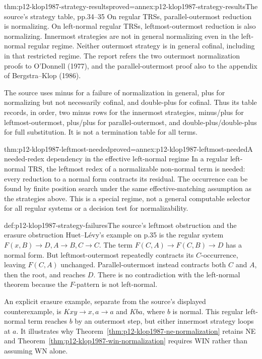 \begin{hbtheorem}{thm:p12-klop1987-strategy-results}{proved=annex:p12-klop1987-strategy-results}{The source's strategy table, pp.34--35}
On regular TRSs, parallel-outermost reduction is normalizing. On left-normal regular TRSs,
leftmost-outermost reduction is also normalizing. Innermost strategies
are not in general normalizing even in the left-normal regular regime.
Neither outermost strategy is in general cofinal, including in that
restricted regime. The report refers the two outermost normalization
proofs to O'Donnell (1977), and the parallel-outermost proof also to the
appendix of Bergstra--Klop (1986).
\end{hbtheorem}

The source uses minus for a failure of normalization in general, plus
for normalizing but not necessarily cofinal, and double-plus for cofinal.
Thus its table records, in order, two minus rows for the innermost
strategies, minus/plus for leftmost-outermost, plus/plus for
parallel-outermost, and double-plus/double-plus for full substitution.
It is not a termination table for all terms.

\begin{hblemma}{thm:p12-klop1987-leftmost-needed}{proved=annex:p12-klop1987-leftmost-needed}{A needed-redex dependency in the effective left-normal regime}
In a regular left-normal TRS, the leftmost redex of a normalizable
non-normal term is needed: every reduction to a normal form contracts
its residual. The occurrence can be found by finite position search
under the same effective-matching assumption as the strategies above.
This is a special regime, not a general computable selector for all
regular systems or a decision test for normalizability.
\end{hblemma}

\begin{hbexample}{def:p12-klop1987-strategy-failures}{The source's leftmost obstruction and the erasure obstruction}
Huet--L\'evy's example on p.35 is the regular system
\(F(x,B)\to D,A\to B,C\to C\).
The term \(F(C,A)\to F(C,B)\to D\) has a normal form.
But leftmost-outermost repeatedly contracts its \(C\)-occurrence,
leaving \(F(C,A)\) unchanged. Parallel-outermost instead contracts
both \(C\) and \(A\), then the root, and reaches \(D\).
There is no contradiction with the left-normal theorem because the
\(F\)-pattern is not left-normal.

An explicit erasure example, separate from the source's displayed
counterexample, is \(Kxy\to x,a\to a\) and \(Kba\), where
\(b\) is normal. This regular left-normal term reaches \(b\)
by an outermost step, but either innermost strategy loops at \(a\).
It illustrates why Theorem~\ref{thm:p12-klop1987-ne-normalization}
retains NE and Theorem~\ref{thm:p12-klop1987-win-normalization}
requires WIN rather than assuming WN alone.
\end{hbexample}

